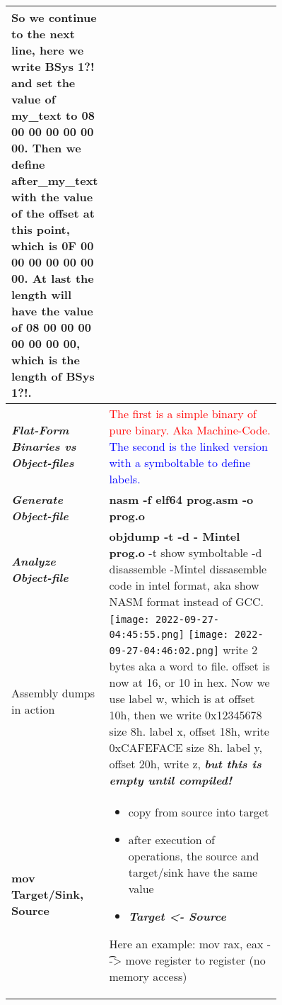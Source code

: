 \documentclass[main.tex,fontsize=8pt,paper=a4,paper=portrait,DIV=calc,]{scrartcl}
\begin{document}
\begin{table}[h!]
\begin{tabular}{|m{0,2\linewidth}|m{0.755\linewidth}|}
So we continue to the next line, here we write BSys 1?! and set the value of my\_text to 08 00 00 00 00 00 00.\newline
Then we define after\_my\_text with the value of the offset at this point, which is 0F 00 00 00 00 00 00 00.\newline
At last the length will have the value of 08 00 00 00 00 00 00 00, which is the length of BSys 1?!.\\
\hline
\textbf{\emph{Flat-Form Binaries vs Object-files}} & \textcolor{red}{The first is a simple binary of pure binary. Aka Machine-Code.}\newline
\textcolor{blue}{The second is the linked version with a symboltable to define labels.}\\
\hline
\textbf{\emph{Generate Object-file}} & \textbf{nasm -f elf64 prog.asm -o prog.o}\\
\hline
\textbf{\emph{Analyze Object-file}} & \textbf{objdump -t -d - Mintel prog.o}\newline
-t show symboltable \newline
-d disassemble\newline
-Mintel dissasemble code in intel format, aka show NASM format instead of GCC.\\
\hline
Assembly dumps in action & \vspace{2mm} \texttt{[image: 2022-09-27-04:45:55.png]} \texttt{[image: 2022-09-27-04:46:02.png]}\newline
write 2 bytes aka a word to file. offset is now at 16, or 10 in hex.\newline
Now we use label w, which is at offset 10h, then we write 0x12345678 size 8h.\newline
label x, offset 18h, write 0xCAFEFACE size 8h.\newline
label y, offset 20h, write z, \textbf{\emph{but this is empty until compiled!}}
\\
\hline
\textbf{mov Target/Sink, Source} & 
\vspace{2mm}
\begin{itemize}
  \item copy from source into target
  \item after execution of operations, the source and target/sink have the same value
  \item \emph{\textbf{Target <- Source}}
\end{itemize}
Here an example: \newline
mov rax, eax \t --> move register to register (no memory access) \newline

\end{tabular}
\end{table}
\end{document}
